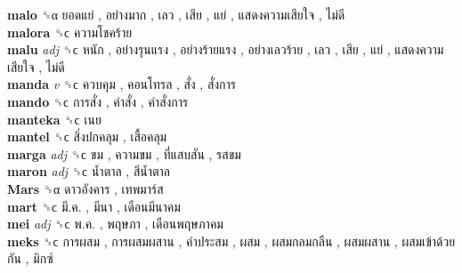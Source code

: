 \textbf{malo} ␝α   ยอดแย่ ,  อย่างมาก ,  เลว ,  เสีย ,  แย่ ,  แสดงความเสียใจ ,  ไม่ดี   \\
\textbf{malora} ␝ϲ   ความโชคร้าย   \\
\textbf{malu} \emph{adj}  ␝ϲ   หนัก ,  อย่างรุนแรง ,  อย่างร้ายแรง ,  อย่างเลวร้าย ,  เลว ,  เสีย ,  แย่ ,  แสดงความเสียใจ ,  ไม่ดี   \\
\textbf{manda} \emph{v}  ␝ϲ   ควบคุม ,  คอนโทรล ,  สั่ง ,  สั่งการ   \\
\textbf{mando} ␝ϲ   การสั่ง ,  คำสั่ง ,  คำสั่งการ   \\
\textbf{manteka} ␝ϲ   เนย   \\
\textbf{mantel} ␝ϲ   สิ่งปกคลุม ,  เสื้อคลุม   \\
\textbf{marga} \emph{adj}  ␝ϲ   ขม ,  ความขม ,  ที่แสบสัน ,  รสขม   \\
\textbf{maron} \emph{adj}  ␝ϲ   น้ำตาล ,  สีน้ำตาล   \\
\textbf{Mars} ␝α   ดาวอังคาร ,  เทพมาร์ส   \\
\textbf{mart} ␝ϲ   มี.ค. ,  มีนา ,  เดือนมีนาคม   \\
\textbf{mei} \emph{adj}  ␝ϲ   พ.ค. ,  พฤษภา ,  เดือนพฤษภาคม   \\
\textbf{meks} ␝ϲ   การผสม ,  การผสมผสาน ,  คำประสม ,  ผสม ,  ผสมกลมกลืน ,  ผสมผสาน ,  ผสมเข้าด้วยกัน ,  มิกซ์   \\
